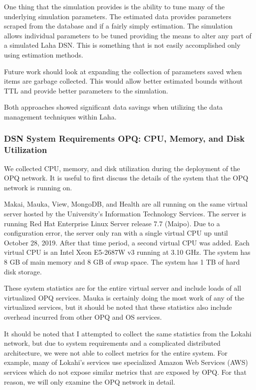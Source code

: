 One thing that the simulation provides is the ability to tune many of the underlying simulation parameters. The estimated data provides parameters scraped from the database and if a fairly simply estimation. The simulation allows individual parameters to be tuned providing the means to alter any part of a simulated Laha DSN. This is something that is not easily accomplished only using estimation methods.

Future work should look at expanding the collection of parameters saved when items are garbage collected. This would allow better estimated bounds without TTL and provide better parameters to the simulation.

Both approaches showed significant data savings when utilizing the data management techniques within Laha.

\subsubsection{DSN System Requirements OPQ: CPU, Memory, and Disk Utilization}

We collected CPU, memory, and disk utilization during the deployment of the OPQ network. It is useful to first discuss the details of the system that the OPQ network is running on.

Makai, Mauka, View, MongoDB, and Health are all running on the same virtual server hosted by the University's Information Technology Services. The server is running Red Hat Enterprise Linux Server release 7.7 (Maipo). Due to a configuration error, the server only ran with a single virtual CPU up until October 28, 2019. After that time period, a second virtual CPU was added. Each virtual CPU is an Intel Xeon E5-2687W v3 running at 3.10 GHz. The system has 8 GB of main memory and 8 GB of swap space. The system has 1 TB of hard disk storage.

These system statistics are for the entire virtual server and include loads of all virtualized OPQ services. Mauka is certainly doing the most work of any of the virtualized services, but it should be noted that these statistics also include overhead incurred from other OPQ and OS services.

It should be noted that I attempted to collect the same statistics from the Lokahi network, but due to system requirements and a complicated distributed architecture, we were not able to collect metrics for the entire system. For example, many of Lokahi's services use specialized Amazon Web Services (AWS) services which do not expose similar metrics that are exposed by OPQ. For that reason, we will only examine the OPQ network in detail.

